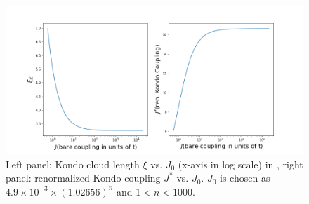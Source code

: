 \documentclass[aps,prx,preprint,groupedaddress]{revtex4-2}
\begin{document}
\begin{figure}
\includegraphics[width=\textwidth]{KondoComplete.png}
\caption{Left panel: Kondo cloud length $\xi$ vs. $J_{0}$ (x-axis in log scale) in , right panel: renormalized Kondo coupling $J^{*}$ vs. $J_{0}$. $J_{0}$ is chosen as $4.9\times 10^{-3}\times(1.02656)^{n}$ and $1<n<1000$.}
\end{figure}
\end{document}
